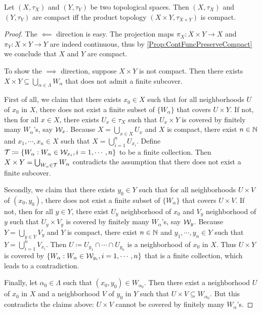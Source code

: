 \documentclass[screen]{techreport}
\numberwithin{equation}{section}
\begin{document}
\begin{theorem}\label{The:ProductOfCompactStillCompact}
	Let $(X,\tau_X)$ and $(Y,\tau_Y)$ be two topological spaces.
	Then $(X,\tau_X)$ and $(Y,\tau_Y)$ are compact iff the product topology $(X \times Y,\tau_{X \times Y})$ is compact. 
\end{theorem}
\begin{proof}
	The $\impliedby$ direction is easy.
	The projection maps $\pi_X : X \times Y \to X$ and $\pi_Y : X \times Y \to Y$ are indeed continuous, thus by \cref{Prop:ContFuncPreserveCompact} we conclude that $X$ and $Y$ are compact.
	
	To show the $\implies$ direction, suppose $X \times Y$ is not compact.
	Then there exists $X \times Y \subseteq \bigcup_{\alpha \in \Lambda} W_\alpha$ that does not admit a finite subcover.
	
	First of all, we claim that there exists $x_0 \in X$ such that for all neighborhoods $U$ of $x_0$ in $X$, there does not exist a finite subset of $\{W_\alpha\}$ that covers $U \times Y$.
	If not, then for all $x \in X$, there exists $U_x \in \tau_X$ such that $U_x \times Y$ is covered by finitely many $W_\alpha$'s, say $\mathcal{W}_x$.
	Because $X = \bigcup_{x \in X} U_x$ and $X$ is compact, there exist $n \in \mathbb{N}$ and $x_1,\cdots,x_n \in X$ such that $X = \bigcup_{i=1}^n U_{x_i}$.
	Define $\mathcal{T} \coloneqq \{ W_\alpha : W_\alpha \in \mathcal{W}_{x_i}, i=1,\cdots,n\}$ to be a finite collection.
	Then $X \times Y = \bigcup_{W_\alpha \in \mathcal{T}} W_\alpha$ contradicts the assumption that there does not exist a finite subcover.
	
	Secondly, we claim that there exists $y_0 \in Y$ such that for all neighborhoods $U \times V$ of $(x_0,y_0)$, there does not exist a finite subset of $\{ W_\alpha \}$ that covers $U \times V$.
	If not, then for all $y \in Y$, there exist $U_y$ neighborhood of $x_0$ and $V_y$ neighborhood of $y$ such that $U_y \times V_y$ is covered by finitely many $W_\alpha$'s, say $\mathcal{W}_y$.
	Because $Y = \bigcup_{y \in Y} V_y$ and $Y$ is compact, there exist $n \in \mathbb{N}$ and $y_1,\cdots,y_n \in Y$ such that $Y = \bigcup_{i=1}^n V_{x_i}$.
	Then $U \coloneqq U_{y_1} \cap \cdots \cap U_{y_n}$ is a neighborhood of $x_0$ in $X$.
	Thus $U \times Y$ is covered by $\{ W_\alpha : W_\alpha \in \mathcal{W}_{y_i}, i=1,\cdots,n\}$ that is a finite collection, which leads to a contradiction.
	
	Finally, let $\alpha_0 \in \Lambda$ such that $(x_0,y_0) \in W_{\alpha_0}$.
	Then there exist a neighborhood $U$ of $x_0$ in $X$ and a neighborhood $V$ of $y_0$ in $Y$ such that $U \times V \subseteq W_{\alpha_0}$.
	But this contradicts the claims above: $U \times V$ cannot be covered by finitely many $W_\alpha$'s.
\end{proof}
\end{document}

